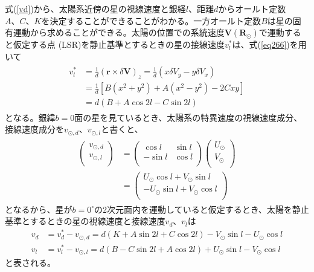 式(\ref{vd})から、太陽系近傍の星の視線速度と銀経$l$、距離$d$からオールト定数$A、C、K$を決定することができることがわかる。一方オールト定数$B$は星の固有運動から求めることができる。太陽の位置での系統速度$\pmb{V}(\pmb{R}_{\odot})$で運動すると仮定する点 (LSR)を静止基準とするときの星の接線速度$v^*_l$は、式(\ref{eq266})を用いて
\begin{align}
\begin{aligned}
	v^*_l &= \frac{1}{d}(\pmb{r} \times \delta\pmb{V})_z = \frac{1}{d}(x\delta V_y - y\delta V_x)\\
	&= \frac{1}{d}[B(x^2 + y^2) + A(x^2 - y^2) - 2Cxy] \\
	&= d(B + A\cos2l - C \sin2l)
\end{aligned}
\end{align}
となる。銀緯$b=0$面の星を見ているとき、太陽系の特異速度の視線速度成分、接線速度成分を$v_{\odot,d}、v_{\odot,l}$と書くと、
\begin{align}
\begin{aligned}
	\left(
	\begin{array}{c}
	 	v_{\odot,d}\\
		v_{\odot,l}\\
	\end{array}
	\right)
	&=
	\left(
	\begin{array}{cc}
	 	\cos l & \sin l\\
		-\sin l & \cos l\\
	\end{array}
	\right)
	\left(
	\begin{array}{c}
	 	U_{\odot}\\
		V_{\odot}\\
	\end{array}
	\right) \\
	&=
	\left(
	\begin{array}{c}
	 	U_{\odot} \cos l + V_{\odot} \sin l\\
		-U_{\odot} \sin l + V_{\odot} \cos l\\
	\end{array}
	\right)
\end{aligned}
\end{align}
となるから、星が$b=0^{\circ}$の2次元面内を運動していると仮定するとき、太陽を静止基準とするときの星の視線速度と接線速度$v_d、v_l$は
\begin{subequations}
\begin{align}
    v_d &= v^*_d - v_{\odot,d} =  d(K+A\sin{2l}+C\cos{2l}) -V_{\odot}\sin{l} - U_{\odot}\cos{l} \label{eq:6} \\
    v_l &= v^*_l - v_{\odot,l} = d(B-C\sin{2l}+A\cos{2l}) + U_{\odot}\sin{l} - V_{\odot}\cos{l} \label{eq:7}
\end{align}
\end{subequations}
と表される。



